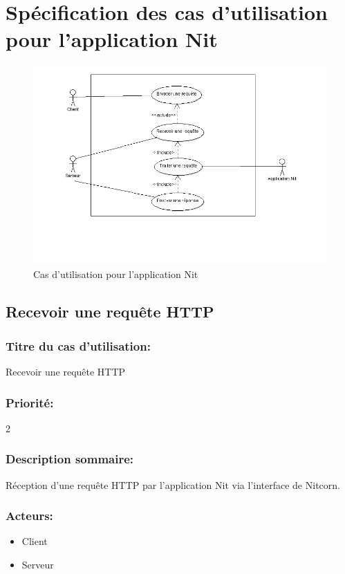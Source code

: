 \documentclass{scrreprt}
\begin{document}
\section{Spécification des cas d'utilisation pour l'application Nit}

\begin{figure}
	\caption{Cas d'utilisation pour l'application Nit}
	\includegraphics[width=\textwidth]{./diagram/section33.png}
\end{figure}

\subsection{Recevoir une requête HTTP}

\subsubsection{Titre du cas d'utilisation:} Recevoir une requête HTTP
\subsubsection{Priorité:} 2

\subsubsection{Description sommaire:}
Réception d'une requête HTTP par l'application Nit via l'interface de Nitcorn.

\subsubsection{Acteurs:}
\begin{itemize}
	\item Client
    	\item Serveur
\end{itemize}
\end{document}
